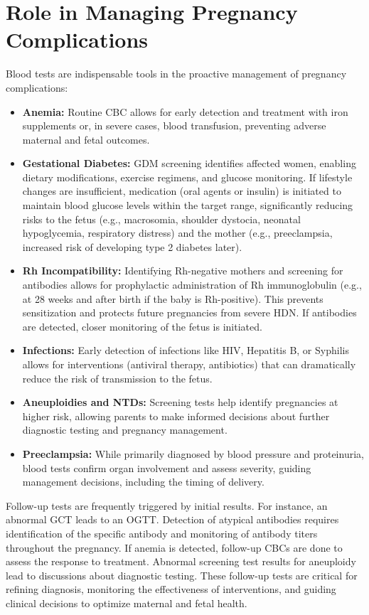 \documentclass{article}
\begin{document}
\section{Role in Managing Pregnancy Complications}
Blood tests are indispensable tools in the proactive management of pregnancy complications:

\begin{itemize}
    \item \textbf{Anemia:} Routine CBC allows for early detection and treatment with iron supplements or, in severe cases, blood transfusion, preventing adverse maternal and fetal outcomes.
    \item \textbf{Gestational Diabetes:} GDM screening identifies affected women, enabling dietary modifications, exercise regimens, and glucose monitoring. If lifestyle changes are insufficient, medication (oral agents or insulin) is initiated to maintain blood glucose levels within the target range, significantly reducing risks to the fetus (e.g., macrosomia, shoulder dystocia, neonatal hypoglycemia, respiratory distress) and the mother (e.g., preeclampsia, increased risk of developing type 2 diabetes later).
    \item \textbf{Rh Incompatibility:} Identifying Rh-negative mothers and screening for antibodies allows for prophylactic administration of Rh immunoglobulin (e.g., at 28 weeks and after birth if the baby is Rh-positive). This prevents sensitization and protects future pregnancies from severe HDN. If antibodies are detected, closer monitoring of the fetus is initiated.
    \item \textbf{Infections:} Early detection of infections like HIV, Hepatitis B, or Syphilis allows for interventions (antiviral therapy, antibiotics) that can dramatically reduce the risk of transmission to the fetus.
    \item \textbf{Aneuploidies and NTDs:} Screening tests help identify pregnancies at higher risk, allowing parents to make informed decisions about further diagnostic testing and pregnancy management.
    \item \textbf{Preeclampsia:} While primarily diagnosed by blood pressure and proteinuria, blood tests confirm organ involvement and assess severity, guiding management decisions, including the timing of delivery.
\end{itemize}

Follow-up tests are frequently triggered by initial results. For instance, an abnormal GCT leads to an OGTT. Detection of atypical antibodies requires identification of the specific antibody and monitoring of antibody titers throughout the pregnancy. If anemia is detected, follow-up CBCs are done to assess the response to treatment. Abnormal screening test results for aneuploidy lead to discussions about diagnostic testing. These follow-up tests are critical for refining diagnosis, monitoring the effectiveness of interventions, and guiding clinical decisions to optimize maternal and fetal health.
\end{document}
